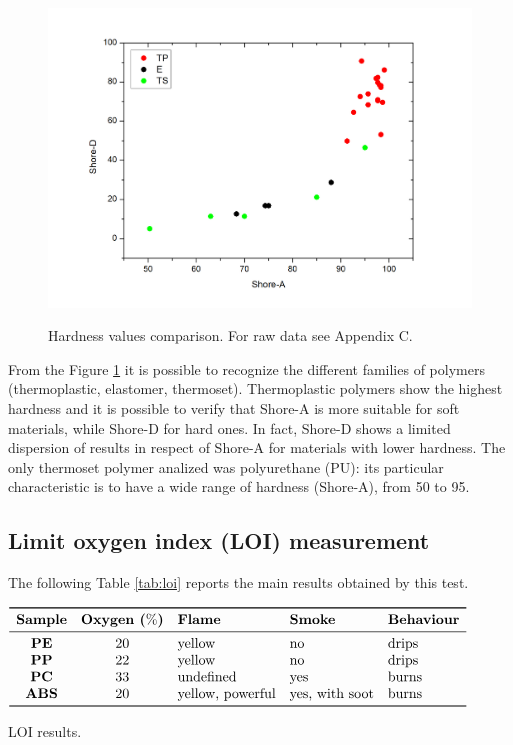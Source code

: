 \documentclass[a4paper, 11pt]{article}
\begin{document}
\begin{figure}[htp]
	\centering
	{\includegraphics[scale=0.3]{duro}}
	\captionsetup{justification=centering}
	\caption{Hardness values comparison. For raw data see Appendix C.}
	\label{fig:duro}
\end{figure}

From the Figure \ref{fig:duro} it is possible to recognize the different families of polymers (thermoplastic, elastomer, thermoset). Thermoplastic polymers show the highest hardness and it is possible to verify that Shore-A is more suitable for soft materials, while Shore-D for hard ones. In fact, Shore-D shows a limited dispersion of results in respect of Shore-A for materials with lower hardness. The only thermoset polymer analized was polyurethane (PU): its particular characteristic is to have a wide range of hardness (Shore-A), from 50 to 95.

\subsection{Limit oxygen index (LOI) measurement} 

The following Table \ref{tab:loi} reports the main results obtained by this test.
\begin{table}[htp]
	\centering
	$
	\begin{array}{cclll}
	\toprule
	\textbf{Sample} & \textbf{Oxygen ($\%$)} & \textbf{Flame} & \textbf{Smoke} & \textbf{Behaviour} \\
	\midrule
	\textbf{PE} & 20 & \text{yellow} & \text{no} & \text{drips}\\
	\textbf{PP} & 22 & \text{yellow} & \text{no} & \text{drips}\\
	\textbf{PC} & 33 & \text{undefined} & \text{yes} & \text{burns}\\
	\textbf{ABS} & 20 & \text{yellow, powerful} & \text{yes, with soot} & \text{burns}\\
	\bottomrule
	\end{array}
	$
	\caption{LOI results.}
	\label{tab:loi}
\end{table}
\end{document}
